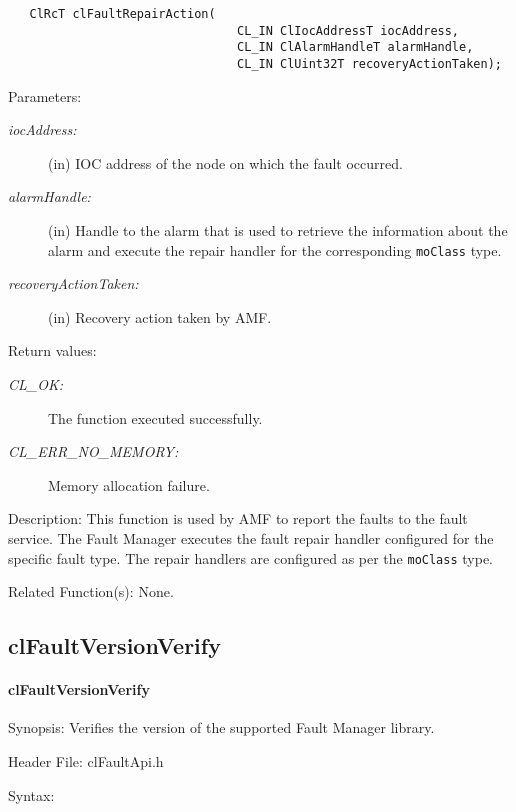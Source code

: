 \begin{flushleft}
\begin{Desc}
\footnotesize\begin{verbatim}   ClRcT clFaultRepairAction(
                           		CL_IN ClIocAddressT iocAddress,
                           		CL_IN ClAlarmHandleT alarmHandle,
                           		CL_IN ClUint32T recoveryActionTaken);
\end{verbatim}
\normalsize
\end{Desc}
\begin{Desc}
\item[Parameters:]
\begin{description}
\item[{\em ioc\-Address:}](in) IOC address of the node on which the fault occurred. 
\item[{\em alarm\-Handle:}](in) Handle to the alarm that is used 
to retrieve the information about the alarm and execute the repair handler for the corresponding {\tt{moClass}} type.
\item[{\em recovery\-Action\-Taken:}](in) Recovery action taken by AMF.
\end{description}
\end{Desc}
\begin{Desc}
\item[Return values:]
\begin{description}
\item[{\em CL\_\-OK:}]The function executed successfully. \item[{\em CL\_\-ERR\_\-NO\_\-MEMORY:}]Memory allocation failure.\end{description}
\end{Desc}
\begin{Desc}
\item[Description:]This function is used by AMF to report the faults to the fault service. The Fault Manager executes the fault repair handler 
configured for the specific fault type. The repair handlers are configured as per the {\tt{moClass}} type.\end{Desc}
\begin{Desc}
\item[Related Function(s):]None. \end{Desc}
\newpage


\subsection{clFaultVersionVerify}
\hypertarget{pagefm102}{}\paragraph{cl\-Fault\-Version\-Verify}\label{pagefm102}
\begin{Desc}
\item[Synopsis:]Verifies the version of the supported Fault Manager library.\end{Desc}
\begin{Desc}
\item[Header File:]clFaultApi.h\end{Desc}
\begin{Desc}
\item[Syntax:]


\end{Desc}
\end{flushleft}

